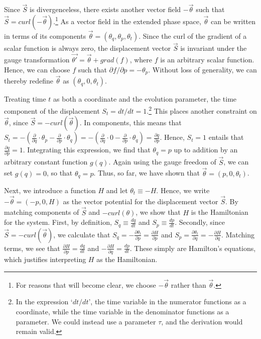 \documentclass[letterpaper]{article}
\renewcommand{\vector}[1]{\ensuremath{\vec{#1}}} %
\begin{document}
Since $\vector{S}$ is divergenceless, there exists another vector field $-\vector{\theta}$ such that $\vector{S} = curl(-\vector{\theta} )$.\footnote{For reasons that will become clear, we choose $-\vector{\theta}$ rather than $\vector{\theta}$.} As a vector field in the extended phase space, $\vector{\theta}$ can be written in terms of its components $\vector{\theta} = (\theta_q, \theta_p, \theta_t) $. Since the curl of the gradient of a scalar function is always zero, the displacement vector $\vector{S}$ is invariant under the gauge transformation $\vector{\theta'} =\vector{\theta} + grad(f)$, where $f$ is an arbitrary scalar function. Hence, we can choose $f$ such that $\partial f/ \partial p = -\theta_p $. Without loss of generality, we can thereby redefine $\vector{\theta}$ as $(\theta_q, 0, \theta_t) $.

Treating time $t$ as both a coordinate and the evolution parameter, the time component of the displacement $S_t = dt/ dt = 1$.\footnote{In the expression `$dt/dt$', the time variable in the numerator functions as a coordinate, while the time variable in the denominator functions as a parameter. We could instead use a parameter $\tau$, and the derivation would remain valid.} This places another constraint on $\vector{\theta} $, since $\vector{S} = -curl(\vector{\theta}) $. In components, this means that $S_t = - (\frac{\partial}{\partial q} \cdot \theta_p - \frac{\partial}{\partial p} \cdot \theta_q) = - (\frac{\partial}{\partial q} \cdot 0 - \frac{\partial}{\partial p} \cdot \theta_q) = \frac{\partial q}{\partial p}$. Hence, $S_t = 1$ entails that $\frac{\partial q}{\partial p} = 1$. Integrating this expression, we find that $\theta_q = p$ up to addition by an arbitrary constant function $g(q)$. Again using the gauge freedom of $\vector{S}$, we can set $g(q)=0$, so that $\theta_q = p$. Thus, so far, we have shown that $\vector{\theta} = (p, 0,\theta_t) $.

Next, we introduce a function $H$ and let $ \theta_t \equiv -H$. Hence, we write $-\vector{\theta} = (-p, 0, H) $ as the vector potential for the displacement vector $\vector{S} $. By matching components of $\vector{S}$ and $-curl(\theta)$, we show that $H$ is the Hamiltonian for the system. First, by definition, $S_q \equiv \frac{dq}{dt} $ and $S_p \equiv  \frac{dp}{dt} $. Secondly, since $\vector{S} = -curl(\vector{\theta}) $, we calculate that $S_q = -\frac{\partial \theta_t}{\partial p} = \frac{\partial H}{\partial p}$ and $S_p = \frac{\partial \theta_t}{\partial q}=-\frac{\partial H}{\partial q}$. Matching terms, we see that $\frac{\partial H}{\partial p} =\frac{dq}{dt} $ and $-\frac{\partial H}{\partial q} =\frac{dp}{dt}$. These simply are Hamilton's equations, which justifies interpreting $H$ as the Hamiltonian.
\end{document}
